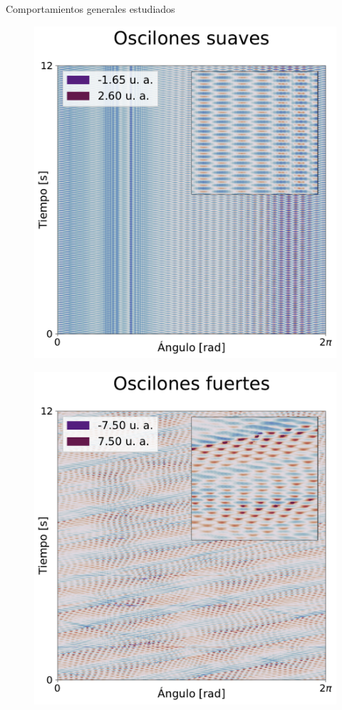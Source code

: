 \documentclass[aspectratio=169]{beamer}
\begin{document}
\begin{frame}{Comportamientos generales estudiados}
	\begin{minipage}{0.30\textwidth}
	  \begin{figure}
		\includegraphics[width=\linewidth]{figs/st_zoologia_oscilones_suaves.pdf}
	  \end{figure}
	\end{minipage} \hfill
	\begin{minipage}{0.30\textwidth}
	  \begin{figure}
		\includegraphics[width=\linewidth]{figs/st_zoologia_oscilones_fuertes.pdf}

\end{figure}
\end{minipage}
\end{frame}
\end{document}
